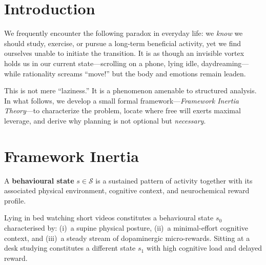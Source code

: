 
\section{Introduction}\label{sec:intro}

We frequently encounter the following paradox in everyday life: we \emph{know}
we should study, exercise, or pursue a long-term beneficial activity, yet we
find ourselves unable to initiate the transition. It is as though an invisible
vortex holds us in our current state---scrolling on a phone, lying idle,
daydreaming---while rationality screams ``move!'' but the body and emotions
remain leaden.

This is not mere ``laziness.'' It is a phenomenon amenable to structured
analysis. In what follows, we develop a small formal framework---\emph{Framework
Inertia Theory}---to characterize the problem, locate where free will exerts
maximal leverage, and derive why planning is not optional but \emph{necessary}.

\section{Framework Inertia}\label{sec:inertia}

\begin{definition}\label{def:state}
A \textbf{behavioural state} $s \in \mathcal{S}$ is a sustained pattern of
activity together with its associated physical environment, cognitive context,
and neurochemical reward profile.
\end{definition}

\begin{examplebox}
Lying in bed watching short videos constitutes a behavioural state $s_0$
characterised by: (i)~a supine physical posture, (ii)~a minimal-effort
cognitive context, and (iii)~a steady stream of dopaminergic micro-rewards.
Sitting at a desk studying constitutes a different state $s_1$ with high
cognitive load and delayed reward.
\end{examplebox}


